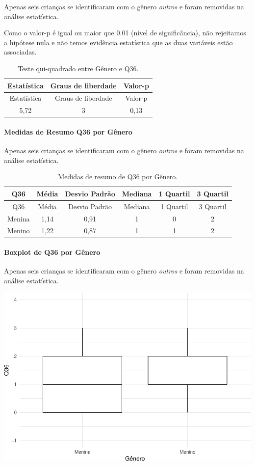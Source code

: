 \documentclass[]{article}
\let\oldparagraph\paragraph
\renewcommand{\paragraph}[1]{\oldparagraph{#1}\mbox{}}
\begin{document}
Apenas seis crianças se identificaram com o gênero \emph{outros} e foram removidas na análise estatística.

Como o valor-p é igual ou maior que 0.01 (nível de significância), não rejeitamos a hipótese nula e não temos evidência estatística que as duas variáveis estão associadas.

\begin{longtable}[]{@{}ccc@{}}
\caption{\label{tab:unnamed-chunk-1324}Teste qui-quadrado entre Gênero e Q36.}\tabularnewline
\toprule
Estatística & Graus de liberdade & Valor-p\tabularnewline
\midrule
\endfirsthead
\toprule
Estatística & Graus de liberdade & Valor-p\tabularnewline
\midrule
\endhead
5,72 & 3 & 0,13\tabularnewline
\bottomrule
\end{longtable}

\cleardoublepage

\hypertarget{medidas-de-resumo-q36-por-guxeanero}{%
\paragraph{Medidas de Resumo Q36 por Gênero}\label{medidas-de-resumo-q36-por-guxeanero}}

Apenas seis crianças se identificaram com o gênero \emph{outros} e foram removidas na análise estatística.

\begin{longtable}[]{@{}cccccc@{}}
\caption{\label{tab:unnamed-chunk-1325}Medidas de resumo de Q36 por Gênero.}\tabularnewline
\toprule
Q36 & Média & Desvio Padrão & Mediana & 1 Quartil & 3 Quartil\tabularnewline
\midrule
\endfirsthead
\toprule
Q36 & Média & Desvio Padrão & Mediana & 1 Quartil & 3 Quartil\tabularnewline
\midrule
\endhead
Menina & 1,14 & 0,91 & 1 & 0 & 2\tabularnewline
Menino & 1,22 & 0,87 & 1 & 1 & 2\tabularnewline
\bottomrule
\end{longtable}

\hypertarget{boxplot-de-q36-por-guxeanero}{%
\paragraph{Boxplot de Q36 por Gênero}\label{boxplot-de-q36-por-guxeanero}}

Apenas seis crianças se identificaram com o gênero \emph{outros} e foram removidas na análise estatística.

\begin{center}\includegraphics[width=0.75\linewidth]{relatorio_covid19_files/figure-latex/unnamed-chunk-1326-1} \end{center}
\end{document}
